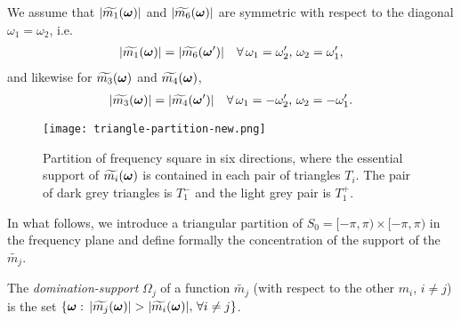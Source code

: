We assume that
$|\widetilde{m_{1}}(\boldsymbol{\omega})|$ and $|\widetilde{m_{6}}(\boldsymbol{\omega})|$ are symmetric with respect to the diagonal $\omega_1=\omega_2$, i.e.
\begin{align}\label{eq: sym-m16}
 |\widetilde{m_1}(\boldsymbol{\omega})| = |\widetilde{m_6}(\boldsymbol{\omega}')|\quad \forall\, \omega_1=\omega_2', \,\omega_2=\omega_1',
\end{align}
and likewise for $\widetilde{m_{3}}(\boldsymbol{\omega})$ and $\widetilde{m_{4}}(\boldsymbol{\omega})$,
\begin{align}\label{eq: sym-m34}
|\widetilde{m_3}(\boldsymbol{\omega})| = |\widetilde{m_4}(\boldsymbol{\omega}')|\quad \forall\, \omega_1=-\omega_2', \,\omega_2=-\omega_1'.
\end{align}
\begin{figure}
\centering
\texttt{[image: triangle-partition-new.png]}
\caption{Partition of frequency square in six directions, where the essential support of $\widetilde{m_{i}}(\boldsymbol{\omega})$ is contained in each pair of triangles $T_i$. The pair of dark grey triangles is $T_1^-$ and the light grey pair is $T_1^+$.}
\label{fig: partition 2}
\end{figure}
In what follows, we introduce a triangular partition of $S_0=[-\pi,\pi)\times[-\pi,\pi)$ in the frequency plane and define formally the concentration of the support of the $\widetilde{m_j}$.

The {\it  domination-support} $\Omega_j$ of a function $\widetilde{m_j}$ (with respect to the other $m_i$, $i\neq j$) is the set $\{\V{\omega}:\,|\widetilde{m_j}(\V{\omega})|> |\widetilde{m_i}(\V{\omega})|,\,\forall i\neq j\}$. \vspace{.5em}

